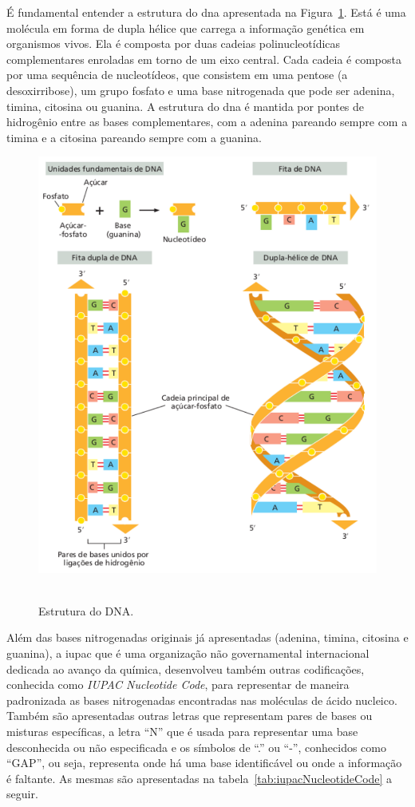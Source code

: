 É fundamental entender a estrutura do \gls{dna} apresentada na Figura~\ref{fig:estruturaDNA}. Está é uma molécula em forma de dupla hélice que carrega a informação genética em organismos vivos. Ela é composta por duas cadeias polinucleotídicas complementares enroladas em torno de um eixo central. Cada cadeia é composta por uma sequência de nucleotídeos, que consistem em uma pentose (a desoxirribose), um grupo fosfato e uma base nitrogenada que pode ser \gls{adenina}, \gls{timina}, \gls{citosina} ou \gls{guanina}. A estrutura do \gls{dna} é mantida por pontes de hidrogênio entre as bases complementares, com a adenina pareando sempre com a timina e a citosina pareando sempre com a guanina.

\begin{figure}[htb]
  \centering
  \caption{Estrutura do DNA.}
  \includegraphics[scale=0.6]{figuras/estruturaDNA_02.pdf}
  ~\label{fig:estruturaDNA}
\end{figure}

Além das bases nitrogenadas originais já apresentadas (\gls{adenina}, \gls{timina}, \gls{citosina} e \gls{guanina}), a \gls{iupac} que é uma organização não governamental internacional dedicada ao avanço da química, desenvolveu também outras codificações, conhecida como \textit{IUPAC Nucleotide Code}, para representar de maneira padronizada as bases nitrogenadas encontradas nas moléculas de ácido nucleico. Também são apresentadas outras letras que representam pares de bases ou misturas específicas, a letra ``N'' que é usada para representar uma base desconhecida ou não especificada e os símbolos de ``.'' ou ``-'', conhecidos como ``GAP'', ou seja, representa onde há uma base identificável ou onde a informação é faltante. As mesmas são apresentadas na tabela~\ref{tab:iupacNucleotideCode} a seguir.

